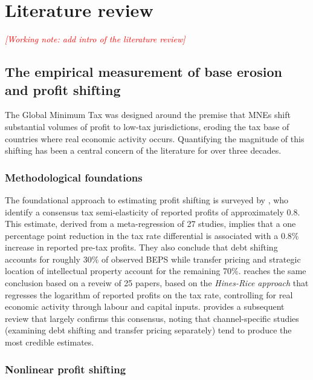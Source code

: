 \documentclass[11pt,a4paper]{article}
\newcommand{\workingnote}[1]{\ifworkingdoc\par\noindent\textcolor{red}{\textit{[Working note: #1]}}\par\fi}
\begin{document}
\section{Literature review}\label{sec:literature}

\workingnote{add intro of the literature review}

\subsection{The empirical measurement of base erosion and profit shifting}\label{sec:beps}

The Global Minimum Tax was designed around the premise that MNEs shift substantial volumes of profit to low-tax jurisdictions, eroding the tax base of countries where real economic activity occurs. Quantifying the magnitude of this shifting has been a central concern of the literature for over three decades.

\subsubsection{Methodological foundations}

The foundational approach to estimating profit shifting is surveyed by \citet{heckemeyer2017}, who identify a consensus tax semi-elasticity of reported profits of approximately 0.8. This estimate, derived from a meta-regression of 27 studies, implies that a one percentage point reduction in the tax rate differential is associated with a 0.8\% increase in reported pre-tax profits. They also conclude that debt shifting accounts for roughly 30\% of observed BEPS while transfer pricing and strategic location of intellectual property account for the remaining 70\%. \citet{dharmapala2014} reaches the same conclusion based on a reveiw of 25 papers, based on the \emph{Hines-Rice approach} that regresses the logarithm of reported profits on the tax rate, controlling for real economic activity through labour and capital inputs. \citet{riedel2018} provides a subsequent review that largely confirms this consensus, noting that channel-specific studies (examining debt shifting and transfer pricing separately) tend to produce the most credible estimates.

\subsubsection{Nonlinear profit shifting}
\end{document}

